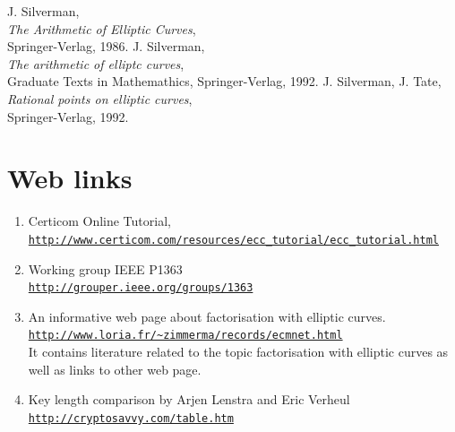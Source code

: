 \begin{thebibliography}{99999}
     J. Silverman, 
        \\
        {\em The Arithmetic of Elliptic Curves},\\
	Springer-Verlag, 1986.
    J. Silverman,
	 \\
        {\em The arithmetic of elliptc curves},\\
	Graduate Texts in Mathemathics, Springer-Verlag, 1992.
    J. Silverman, J. Tate,
	 \\
        {\em Rational points on elliptic curves},\\
	Springer-Verlag, 1992.

\end{thebibliography}

\section*{Web links}

\begin{enumerate}
   \item Certicom Online Tutorial, \\
         \href{http://www.certicom.com/resources/ecc_tutorial/ecc_tutorial.html}{\texttt{http://www.certicom.com/resources/ecc\_tutorial/ecc\_tutorial.html}}
		
   \item Working group IEEE P1363 \\
         \href{http://grouper.ieee.org/groups/1363}{\texttt{http://grouper.ieee.org/groups/1363}}

   \item \hypertarget{Lenstra2}{}
         An informative web page about factorisation with elliptic curves. \\
         \href{http://www.loria.fr/~zimmerma/records/ecmnet.html}
	 {\texttt{http://www.loria.fr/\~{}zimmerma/records/ecmnet.html}} \\
         It contains literature related to the topic factorisation with 
	 elliptic curves as well as links to other web page. 

   \item Key length comparison by Arjen Lenstra and Eric Verheul\\
         \href{http://cryptosavvy.com/table.htm}
	  {\texttt{http://cryptosavvy.com/table.htm}}

\end{enumerate}



